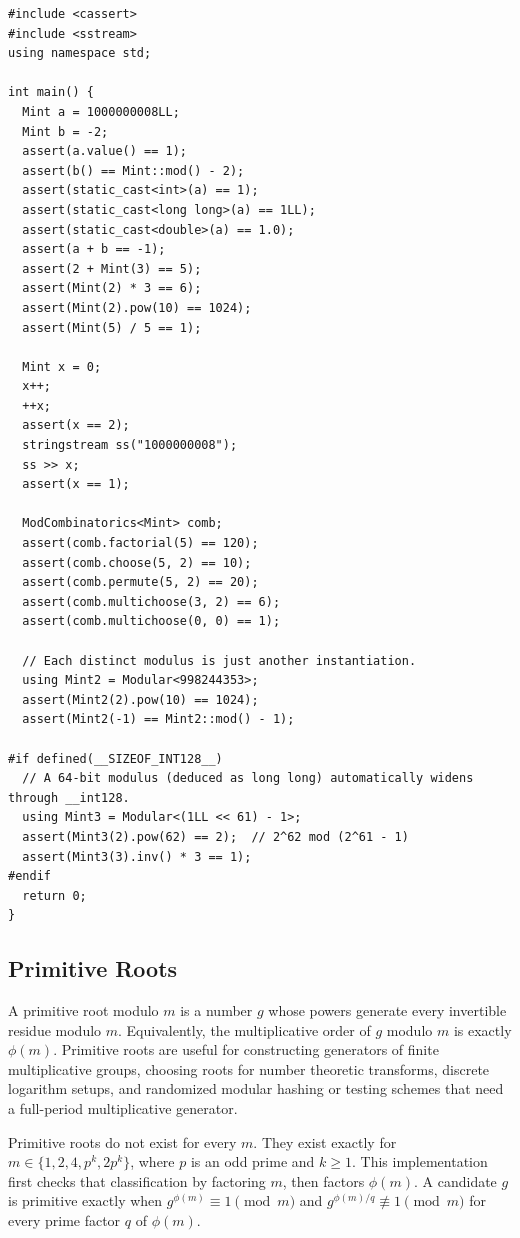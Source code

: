 \begin{lstlisting}[style=cpp]
#include <cassert>
#include <sstream>
using namespace std;

int main() {
  Mint a = 1000000008LL;
  Mint b = -2;
  assert(a.value() == 1);
  assert(b() == Mint::mod() - 2);
  assert(static_cast<int>(a) == 1);
  assert(static_cast<long long>(a) == 1LL);
  assert(static_cast<double>(a) == 1.0);
  assert(a + b == -1);
  assert(2 + Mint(3) == 5);
  assert(Mint(2) * 3 == 6);
  assert(Mint(2).pow(10) == 1024);
  assert(Mint(5) / 5 == 1);

  Mint x = 0;
  x++;
  ++x;
  assert(x == 2);
  stringstream ss("1000000008");
  ss >> x;
  assert(x == 1);

  ModCombinatorics<Mint> comb;
  assert(comb.factorial(5) == 120);
  assert(comb.choose(5, 2) == 10);
  assert(comb.permute(5, 2) == 20);
  assert(comb.multichoose(3, 2) == 6);
  assert(comb.multichoose(0, 0) == 1);

  // Each distinct modulus is just another instantiation.
  using Mint2 = Modular<998244353>;
  assert(Mint2(2).pow(10) == 1024);
  assert(Mint2(-1) == Mint2::mod() - 1);

#if defined(__SIZEOF_INT128__)
  // A 64-bit modulus (deduced as long long) automatically widens through __int128.
  using Mint3 = Modular<(1LL << 61) - 1>;
  assert(Mint3(2).pow(62) == 2);  // 2^62 mod (2^61 - 1)
  assert(Mint3(3).inv() * 3 == 1);
#endif
  return 0;
}
\end{lstlisting}
\subsection{Primitive Roots}
\label{sec:6.3.4}
A primitive root modulo $m$ is a number $g$ whose powers generate every invertible residue modulo $m$. Equivalently, the multiplicative order of $g$ modulo $m$ is exactly $\phi(m)$. Primitive roots are useful for constructing generators of finite multiplicative groups, choosing roots for number theoretic transforms, discrete logarithm setups, and randomized modular hashing or testing schemes that need a full-period multiplicative generator.

Primitive roots do not exist for every $m$. They exist exactly for $m \in \{1, 2, 4, p^k, 2p^k\}$, where $p$ is an odd prime and $k \geq 1$. This implementation first checks that classification by factoring $m$, then factors $\phi(m)$. A candidate $g$ is primitive exactly when $g^{\phi(m)} \equiv 1 \pmod m$ and $g^{\phi(m)/q} \not\equiv 1 \pmod m$ for every prime factor $q$ of $\phi(m)$.

